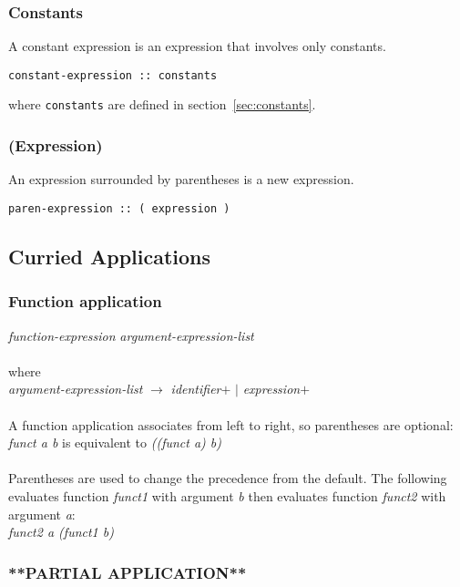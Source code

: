 \subsubsection{Constants}
A constant expression is an expression that involves only constants. 
\begin{verbatim}
constant-expression :: constants
\end{verbatim}
where \texttt{constants} are defined in section~\ref{sec:constants}.

\subsubsection{(Expression)}
An expression surrounded by parentheses is a new expression.
\begin{verbatim}
paren-expression :: ( expression )
\end{verbatim}


\subsection{Curried Applications}
  
    \subsubsection{Function application}
    \emph{function-expression} \emph{argument-expression-list} \\ \\
    where\\
    
    \emph{argument-expression-list} $\rightarrow$ \emph{identifier}$+$ $|$ \emph{expression}$+$ \\ \\ 
    A function application associates from left to right, so parentheses are optional: \\
    
    \emph{funct a b}  is equivalent to \emph{((funct a) b)} \\ \\
    Parentheses are used to change the precedence from the default. The following evaluates function \emph{funct1} with argument \emph{b} then 
    evaluates function \emph{funct2} with argument \emph{a}: \\
    
    \emph{funct2 a (funct1 b)}

  \subsubsection{**PARTIAL APPLICATION**}
  

